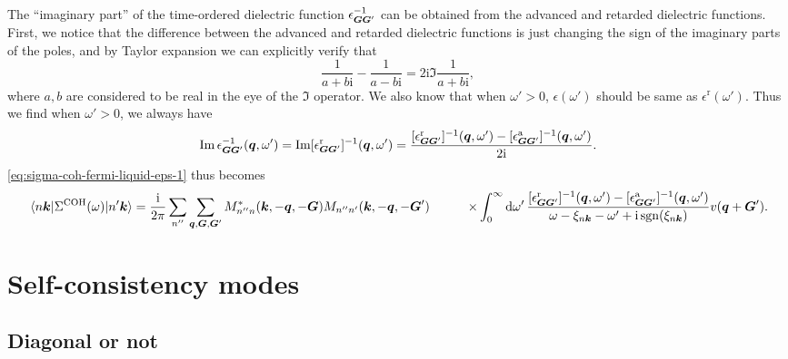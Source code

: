 \documentclass[hyperref, a4paper, 12pt]{report}
\DeclareMathOperator{\sgn}{sgn}
\newcommand*{\ii}{\mathrm{i}}
\def\\{}%
\begin{document}
The ``imaginary part'' of the time-ordered dielectric function $\epsilon_{\vb*{G} \vb*{G}'}^{-1}$
can be obtained from the advanced and retarded dielectric functions.
First, we notice that the difference between the advanced and retarded dielectric functions 
is just changing the sign of the imaginary parts of the poles, 
and by Taylor expansion we can explicitly verify that 
\[
    \frac{1}{a + b \ii}  - \frac{1}{a - b \ii}
    = 2 \ii \Im \frac{1}{a + b \ii}, 
\]
where $a, b$ are considered to be real in the eye of the $\Im$ operator.
We also know that when $\omega' > 0$, 
$\epsilon(\omega')$ should be same as $\epsilon^{\text{r}}(\omega')$.
Thus we find when $\omega' > 0$, 
we always have 
\begin{equation}
    \Im \epsilon^{-1}_{\vb*{G} \vb*{G}'}(\vb*{q}, \omega')
    = \Im [\epsilon^{\text{r}}_{\vb*{G} \vb*{G}'}]^{-1}(\vb*{q}, \omega')
    = \frac{[\epsilon^{\text{r}}_{\vb*{G} \vb*{G}'}]^{-1}(\vb*{q}, \omega') - 
    [\epsilon^{\text{a}}_{\vb*{G} \vb*{G}'}]^{-1}(\vb*{q}, \omega')}{2\ii}  .
\end{equation}
\eqref{eq:sigma-coh-fermi-liquid-eps-1} thus becomes 
\begin{equation}
    \begin{aligned}
        \mel{n \vb*{k}}{\Sigma^{\text{COH}}(\omega)}{n' \vb*{k}}
        &= \frac{\ii}{2\pi} \sum_{n''} \sum_{\vb*{q}, \vb*{G}, \vb*{G}'}
        M^*_{n'' n} (\vb*{k}, - \vb*{q}, - \vb*{G})  M_{n'' n'} (\vb*{k}, - \vb*{q},  -\vb*{G}') \\
        &\quad \quad \times \int_{0}^{\infty} \dd{\omega'} 
        \frac{
            [\epsilon^{\text{r}}_{\vb*{G} \vb*{G}'}]^{-1} (\vb*{q}, \omega')
            - [\epsilon^{\text{a}}_{\vb*{G} \vb*{G}'}]^{-1} (\vb*{q}, \omega') 
        }{\omega - \xi_{n \vb*{k}} - \omega' + \ii \sgn(\xi_{n \vb*{k}})} v(\vb*{q}+\vb*{G}') .
    \end{aligned}
\end{equation}

\section{Self-consistency modes}

\subsection{Diagonal or not}
\end{document}
